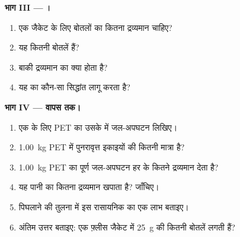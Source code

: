 \begin{problem}
\medskip
\noindent\textbf{भाग III --- ।}
\begin{enumerate}[resume]
  \item एक जैकेट के लिए बोतलों का कितना द्रव्यमान चाहिए?
  \item यह कितनी बोतलें हैं?
  \item बाकी द्रव्यमान का क्या होता है?
  \item यह   का कौन-सा सिद्धांत लागू करता है?
\end{enumerate}

\medskip
\noindent\textbf{भाग IV --- वापस  तक।}
\begin{enumerate}[resume]
  \item एक  के लिए PET का उसके  में जल-अपघटन
        लिखिए।
  \item \qty{1.00}{kg} PET में पुनरावृत्त इकाइयों की कितनी मात्रा है?
  \item \qty{1.00}{kg} PET का पूर्ण जल-अपघटन हर  के कितने द्रव्यमान
        देता है?
  \item यह पानी का कितना द्रव्यमान खपाता है?  जाँचिए।
  \item पिघलाने की तुलना में इस रासायनिक  का एक लाभ बताइए।
  \item अंतिम उत्तर बताइए: एक फ़्लीस जैकेट में \qty{25}{g} की कितनी बोतलें
        लगती हैं?
\end{enumerate}
\end{problem}
